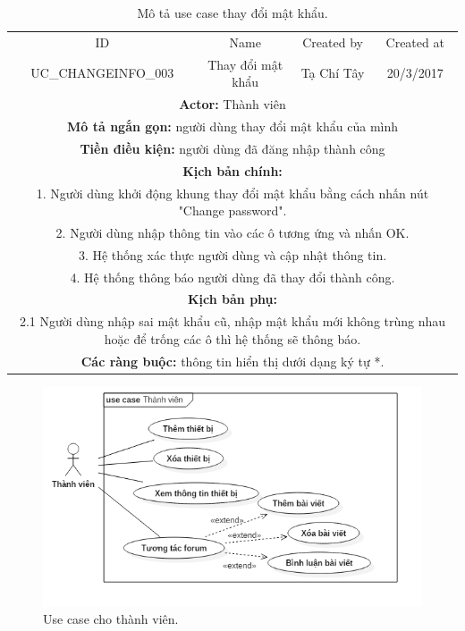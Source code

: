 \documentclass[a4paper,12pt,oneside]{article}
\begin{document}
\begin{table}[!htp]
\centering
\begin{tabularx}{\linewidth}{ |c||c|c|c| }
\hline
ID & Name & Created by & Created at\\
UC\_CHANGEINFO\_003 & Thay đổi mật khẩu & Tạ Chí Tây & 20/3/2017\\
\hline
\multicolumn{4}{|X|}{\textbf{Actor:} Thành viên }\\
\hline
\multicolumn{4}{|X|}{\textbf{Mô tả ngắn gọn:} người dùng thay đổi mật khẩu của mình}\\
\hline
\multicolumn{4}{|X|}{\textbf{Tiền điều kiện:} người dùng đã đăng nhập thành công}\\
\hline
\multicolumn{4}{|X|}{\textbf{Kịch bản chính:}}\\
\multicolumn{4}{|X|}{1. Người dùng khởi động khung thay đổi mật khẩu bằng cách nhấn nút "Change password".}\\
\multicolumn{4}{|X|}{
2.	Người dùng nhập thông tin vào các ô tương ứng và nhấn OK.}\\
\multicolumn{4}{|X|}{
3.	Hệ thống xác thực người dùng và cập nhật thông tin.}\\
\multicolumn{4}{|X|}{
4.	Hệ thống thông báo người dùng đã thay đổi thành công.}\\
\hline
\multicolumn{4}{|X|}{\textbf{Kịch bản phụ:}}\\
\multicolumn{4}{|X|}{2.1    Người dùng nhập sai mật khẩu cũ, nhập mật khẩu mới không trùng nhau hoặc để trống các ô thì hệ thống sẽ thông báo.}\\
\hline
\multicolumn{4}{|X|}{\textbf{Các ràng buộc:} thông tin hiển thị dưới dạng ký tự *.}\\
\hline
\end{tabularx}
\caption{Mô tả use case thay đổi mật khẩu.}
\end{table}

\begin{figure}[H]
	\centering
	\includegraphics[scale=.7]{hinh/usecase-member.png}
	\caption{Use case cho thành viên.}
\end{figure}
\end{document}
